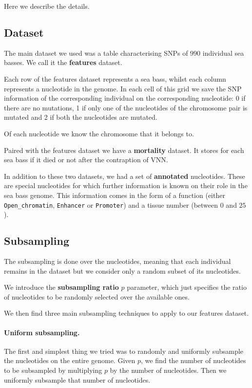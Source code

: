 Here we describe the details.


\subsection{Dataset}

The main dataset we used was a table characterising SNPs of $990$ individual sea basses. We call it the \textbf{features} dataset.

Each row of the features dataset represents a sea bass, whilst each column represents a nucleotide in the genome.
In each cell of this grid we save the SNP information of the corresponding individual on the corresponding nucleotide: 0 if there are no mutations, 1 if only one of the nucleotides of the chromosome pair is mutated and 2 if both the nucleotides are mutated.


Of each nucleotide we know the chromosome that it belongs to.

Paired with the features dataset we have a \textbf{mortality} dataset. 
It stores for each sea bass if it died or not after the contraption of VNN.

In addition to these two datasets, we had a set of \textbf{annotated} nucleotides.
These are special nucleotides for which further information is known on their role in the sea bass genome.
This information comes in the form of a function (either \texttt{Open\_chromatin}, \texttt{Enhancer} or \texttt{Promoter}) and a tissue number (between $0$ and $25$).


\subsection{Subsampling}

The subsampling is done over the nucleotides, meaning that each individual remains in the dataset but we consider only a random subset of its nucleotides.

We introduce the \textbf{subsampling ratio} $p$ parameter, which just specifies the ratio of nucleotides to be randomly selected over the available ones.

We then find three main subsampling techniques to apply to our features dataset.

\paragraph{Uniform subsampling.}
The first and simplest thing we tried was to randomly and uniformly subsample the nucleotides on the entire genome.
Given $p$, we find the number of nucleotides to be subsampled by multiplying $p$ by the number of nucleotides.
Then we uniformly subsample that number of nucleotides.

